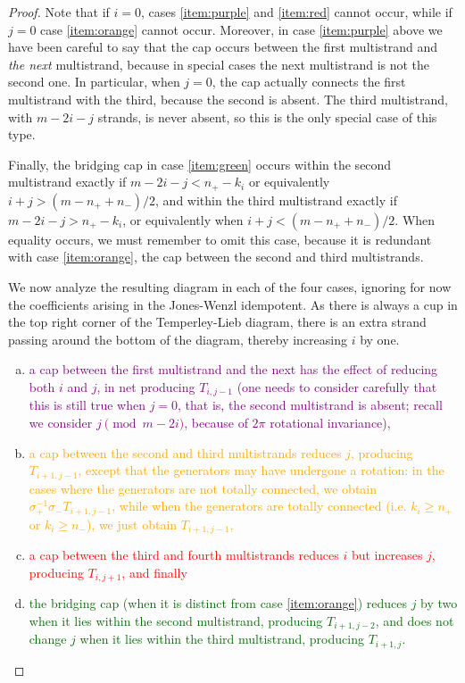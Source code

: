 \documentclass[12pt]{article}
\begin{document}
\begin{proof}
Note that if $i=0$, cases \eqref{item:purple} and \eqref{item:red} cannot occur, while if $j=0$ case \eqref{item:orange} cannot occur. Moreover, in case \eqref{item:purple} above we have been careful to say that the cap occurs between the first multistrand and \emph{the next} multistrand, because in special cases the next multistrand is not the second one. In particular, when $j=0$, the cap actually connects the first multistrand with the third, because the second is absent. The third multistrand, with $m-2i-j$ strands, is never absent, so this is the only special case of this type.

Finally, the bridging cap in case \eqref{item:green} occurs within the second multistrand exactly if $m-2i-j < n_+ - k_i$ or equivalently $i+j > (m - n_+ + n_-)/2$, and within the third multistrand exactly if $m-2i-j > n_+ - k_i$, or equivalently when $i+j < (m - n_+ + n_-)/2$. When equality occurs, we must remember to omit this case, because it is redundant with case \eqref{item:orange}, the cap between the second and third multistrands.

We now analyze the resulting diagram in each of the four cases, ignoring for now the coefficients arising in the Jones-Wenzl idempotent. As there is always a cup in the top right corner of the Temperley-Lieb diagram, there is an extra strand passing around the bottom of the diagram, thereby increasing $i$ by one.
\begin{enumerate}[(a)]
\item
\textcolor{purple}{
a cap between the first multistrand and the next has the effect of reducing both $i$ and $j$, in net producing $T_{i,j-1}$ (one needs to consider carefully that this is still true when $j=0$, that is, the second multistrand is absent; recall we consider $j \pmod{m-2i}$, because of $2\pi$ rotational invariance),
}
\item
\textcolor{orange}{
a cap between the second and third multistrands reduces $j$, producing $T_{i+1, j-1}$, except that the generators may have undergone a rotation: in the cases where the generators are not totally connected, we obtain $\sigma_+^{-1} \sigma_- T_{i+1, j-1}$, while when the generators are totally connected (i.e. $k_i \geq n_+$ or $k_i \geq   n_-$), we just obtain $T_{i+1,j-1}$,
}
\item
\textcolor{red}{
a cap between the third and fourth multistrands reduces $i$ but increases $j$, producing $T_{i, j+1}$, and finally
}
\item
\textcolor{DarkGreen}{
the bridging cap (when it is distinct from case \eqref{item:orange}) reduces $j$ by two when it lies within the second multistrand, producing $T_{i+1, j - 2}$, and does not change $j$ when it lies within the third multistrand, producing $T_{i+1, j}$. 
}
\end{enumerate}


\end{proof}
\end{document}
